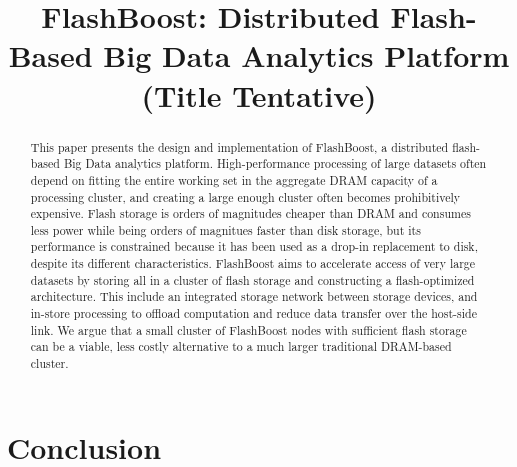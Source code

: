 \documentclass[pageno]{jpaper}
\begin{document}
\title{
FlashBoost: Distributed Flash-Based Big Data Analytics Platform
(Title Tentative)
}

\date{}
\maketitle


\begin{abstract}
This paper presents the design and implementation of FlashBoost, a distributed
flash-based Big Data analytics platform. High-performance processing of large
datasets often depend on fitting the entire working set in the aggregate DRAM
capacity of a processing cluster, and creating a large enough cluster often
becomes prohibitively expensive. Flash storage is orders of magnitudes cheaper
than DRAM and consumes less power while being orders of magnitues faster than
disk storage, but its performance is constrained because it has been used as a
drop-in replacement to disk, despite its different characteristics.  FlashBoost
aims to accelerate access of very large datasets by storing all in a cluster of
flash storage and constructing a flash-optimized architecture. This include an
integrated storage network between storage devices, and in-store processing to
offload computation and reduce data transfer over the host-side link.  We argue
that a small cluster of FlashBoost nodes with sufficient flash storage can be a
viable, less costly alternative to a much larger traditional DRAM-based cluster.
\end{abstract}



%








\section{Conclusion}



\end{document}
